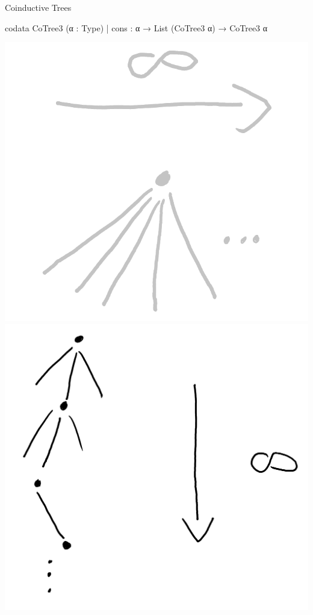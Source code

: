 \documentclass[t,12pt]{beamer}
\begin{document}


\begin{frame}[fragile]{Coinductive Trees}
    \vfill
\begin{leancode}
codata CoTree3 (α : Type)
  | cons : α → List (CoTree3 α) → CoTree3 α
\end{leancode}

\medskip

{
    \hfill
    \includegraphics[scale=0.1]{tree_inf_wide_grey.png}
    \hspace*{2.6cm}
    \includegraphics[scale=0.07]{tree_inf_deep.png}    
    \hfill
}



     
\end{frame}
    
\end{document}
